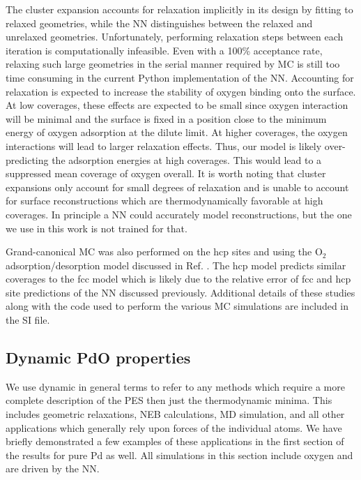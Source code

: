 \documentclass[12pt]{cmuthesis}
\begin{document}
The cluster expansion accounts for relaxation implicitly in its design by fitting to relaxed geometries, while the NN distinguishes between the relaxed and unrelaxed geometries. Unfortunately, performing relaxation steps between each iteration is computationally infeasible. Even with a 100\% acceptance rate, relaxing such large geometries in the serial manner required by MC is still too time consuming in the current Python implementation of the NN. Accounting for relaxation is expected to increase the stability of oxygen binding onto the surface. At low coverages, these effects are expected to be small since oxygen interaction will be minimal and the surface is fixed in a position close to the minimum energy of oxygen adsorption at the dilute limit. At higher coverages, the oxygen interactions will lead to larger relaxation effects. Thus, our model is likely over-predicting the adsorption energies at high coverages. This would lead to a suppressed mean coverage of oxygen overall. It is worth noting that cluster expansions only account for small degrees of relaxation and is unable to account for surface reconstructions which are thermodynamically favorable at high coverages. In principle a NN could accurately model reconstructions, but the one we use in this work is not trained for that.

Grand-canonical MC was also performed on the hcp sites and using the O\(_{\text{2}}\) adsorption/desorption model discussed in Ref. . The hcp model predicts similar coverages to the fcc model which is likely due to the relative error of fcc and hcp site predictions of the NN discussed previously. Additional details of these studies along with the code used to perform the various MC simulations are included in the SI file.

\subsection{Dynamic PdO properties}
\label{sec:orgc568474}
We use dynamic in general terms to refer to any methods which require a more complete description of the PES then just the thermodynamic minima. This includes geometric relaxations, NEB calculations, MD simulation, and all other applications which generally rely upon forces of the individual atoms. We have briefly demonstrated a few examples of these applications in the first section of the results for pure Pd as well. All simulations in this section include oxygen and are driven by the NN.
\end{document}
